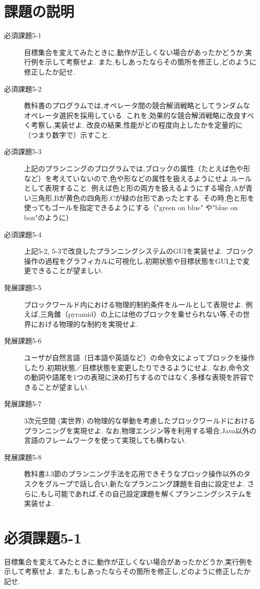 \documentclass[uplatex,12pt]{jsarticle}
\begin{document}
\section{課題の説明}
\begin{description}
\item[必須課題5-1] 目標集合を変えてみたときに,動作が正しくない場合があったかどうか,実行例を示して考察せよ.
また,もしあったならその箇所を修正し,どのように修正したか記せ.
\item[必須課題5-2] 教科書のプログラムでは,オペレータ間の競合解消戦略としてランダムなオペレータ選択を採用している.
これを,効果的な競合解消戦略に改良すべく考察し,実装せよ.
改良の結果,性能がどの程度向上したかを定量的に（つまり数字で）示すこと.
\item[必須課題5-3] 上記のプランニングのプログラムでは,ブロックの属性（たとえば色や形など）を考えていないので,色や形などの属性を扱えるようにせよ.ルールとして表現すること.
例えば色と形の両方を扱えるようにする場合,Aが青い三角形,Bが黄色の四角形,Cが緑の台形であったとする.
その時,色と形を使ってもゴールを指定できるようにする（"green on blue" や"blue on box"のように）
\item[必須課題5-4] 上記5-2, 5-3で改良したプランニングシステムのGUIを実装せよ.
ブロック操作の過程をグラフィカルに可視化し,初期状態や目標状態をGUI上で変更できることが望ましい.
\item[発展課題5-5] ブロックワールド内における物理的制約条件をルールとして表現せよ.
例えば,三角錐（pyramid）の上には他のブロックを乗せられない等,その世界における物理的な制約を実現せよ.
\item[発展課題5-6] ユーザが自然言語（日本語や英語など）の命令文によってブロックを操作したり,初期状態／目標状態を変更したりできるようにせよ.
なお,命令文の動詞や語尾を1つの表現に決め打ちするのではなく,多様な表現を許容できることが望ましい.
\item[発展課題5-7] 3次元空間 (実世界) の物理的な挙動を考慮したブロックワールドにおけるプランニングを実現せよ.
なお,物理エンジン等を利用する場合,Java以外の言語のフレームワークを使って実現しても構わない.
\item[発展課題5-8] 教科書3.3節のプランニング手法を応用できそうなブロック操作以外のタスクをグループで話し合い,新たなプランニング課題を自由に設定せよ.
さらに,もし可能であれば,その自己設定課題を解くプランニングシステムを実装せよ.
\end{description}

\section{必須課題5-1}
\begin{screen}
目標集合を変えてみたときに,動作が正しくない場合があったかどうか,実行例を示して考察せよ.
また,もしあったならその箇所を修正し,どのように修正したか記せ.
\end{screen}
\end{document}
